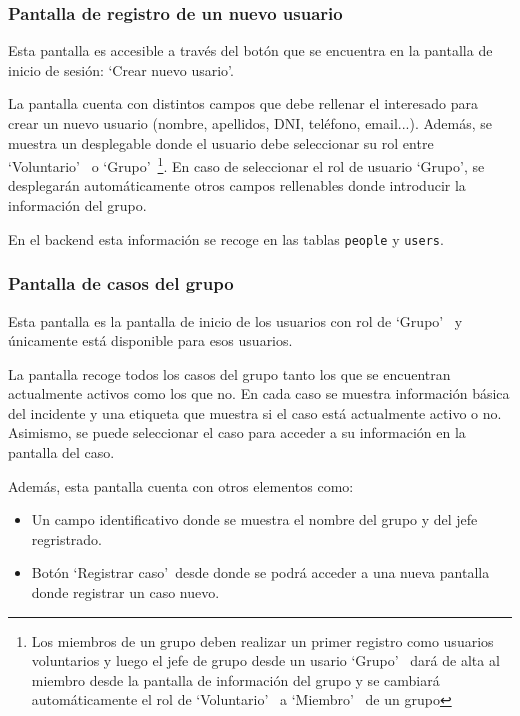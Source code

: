 


     \subsubsection{Pantalla de registro de un nuevo usuario}

     Esta pantalla es accesible a través del botón que se encuentra en la pantalla de inicio de sesión: `Crear nuevo usario'. 
     
     La pantalla cuenta con distintos campos que debe rellenar el interesado para crear un nuevo usuario (nombre, apellidos, DNI, teléfono, email...). Además, se muestra un desplegable donde el usuario debe seleccionar su rol entre `Voluntario'~ o `Grupo'~\footnote{Los miembros de un grupo deben realizar un primer registro como usuarios voluntarios y luego el jefe de grupo desde un usario `Grupo'~ dará de alta al miembro desde la pantalla de información del grupo y se cambiará automáticamente el rol de `Voluntario'~ a `Miembro'~ de un grupo}. En caso de seleccionar el rol de usuario `Grupo', se desplegarán automáticamente otros campos rellenables donde introducir la información del grupo.

     En el backend esta información se recoge en las tablas \texttt{people} y \texttt{users}.




     \subsubsection{Pantalla de casos del grupo}
     Esta pantalla es la pantalla de inicio de los usuarios con rol de `Grupo'~ y únicamente está disponible para esos usuarios.

     La pantalla recoge todos los casos del grupo tanto los que se encuentran actualmente activos como los que no. En cada caso se muestra información básica del incidente y una etiqueta que muestra si el caso está actualmente activo o no. Asimismo, se puede seleccionar el caso para acceder a su información en la pantalla del caso.

     Además, esta pantalla cuenta con otros elementos como:
     \begin{itemize}
     \item Un campo identificativo donde se muestra el nombre del grupo y del jefe regristrado.
     \item Botón `Registrar caso'~desde donde se podrá acceder a una nueva pantalla donde registrar un caso nuevo.
     \end{itemize}

